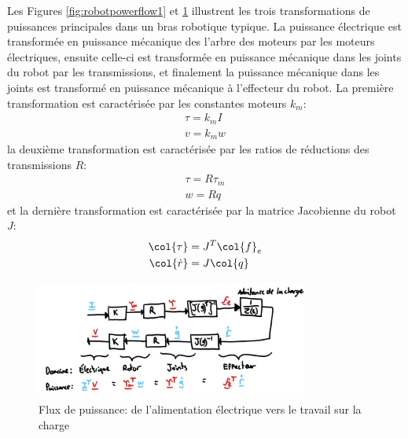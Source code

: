 Les Figures \ref{fig:robotpowerflow1} et \ref{fig:robotpowerflow2} illustrent les trois transformations de puissances principales dans un bras robotique typique. La puissance électrique est transformée en puissance mécanique des l'arbre des moteurs par les moteurs électriques, ensuite celle-ci est transformée en puissance mécanique dans les joints du robot par les transmissions, et finalement la puissance mécanique dans les joints est transformé en puissance mécanique à l'effecteur du robot. La première transformation est caractérisée par les constantes moteurs $k_m$:
\begin{align}
\tau = k_m I \\%
v = k_m w %
\end{align}
la deuxième transformation est caractérisée par les ratios de réductions des transmissions $R$:
\begin{align}
\tau = R \tau_m \\%
w = R q %
\end{align}
et la dernière transformation est caractérisée par la matrice Jacobienne du robot $J$:
\begin{align}
\col{\tau} &= J^T \col{f}_e \\
\col{\dot{r}} &= J \col{q}
\end{align}

\begin{figure}[htpb]
	\centering
		\includegraphics[width=0.80\textwidth]{fig/robotpowerflow2.jpg}
	\caption{Flux de puissance: de l'alimentation électrique vers le travail sur la charge}
	\label{fig:robotpowerflow2}
\end{figure}





